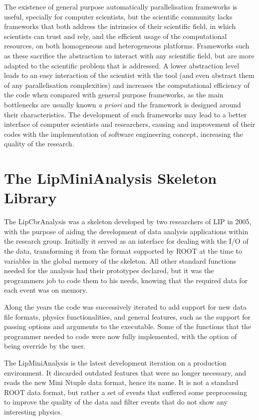 The existence of general purpose automatically parallelisation frameworks is useful, specially for computer scientists, but the scientific community lacks frameworks that both address the intrinsics of their scientific field, in which scientists can trust and rely, and the efficient usage of the computational resources, on both homogeneous and heterogeneous platforms. Frameworks such as these sacrifice the abstraction to interact with any scientific field, but are more adapted to the scientific problem that is addressed. A lower abstraction level leads to an easy interaction of the scientist with the tool (and even abstract them of any parallelisation complexities) and increases the computational efficiency of the code when compared with general purpose frameworks, as the main bottlenecks are usually known \textit{a priori} and the framework is designed around their characteristics. The development of such frameworks may lead to a better interface of computer scientists and researchers, causing and improvement of their codes with the implementation of software engineering concept, increasing the quality of the research.

\section{The LipMiniAnalysis Skeleton Library}
\label{lipminianalysis}

The LipCbrAnalysis was a skeleton developed by two researchers of LIP in 2005, with the purpose of aiding the development of data analysis applications within the research group. Initially it served as an interface for dealing with the I/O of the data, transforming it from the format supported by ROOT at the time to variables in the global memory of the skeleton. All other standard functions needed for the analysis had their prototypes declared, but it was the programmers job to code them to his needs, knowing that the required data for each event was on memory.

Along the years the code was successively iterated to add support for new data file formats, physics functionalities, and general features, such as the support for passing options and arguments to the executable. Some of the functions that the programmer needed to code were now fully implemented, with the option of being override by the user.

The LipMiniAnalysis is the latest development iteration on a production environment. It discarded outdated features that were no longer necessary, and reads the new Mini Ntuple data format, hence its name. It is not a standard ROOT data format, but rather a set of events that suffered some preprocessing to improve the quality of the data and filter events that do not show any interesting physics.

